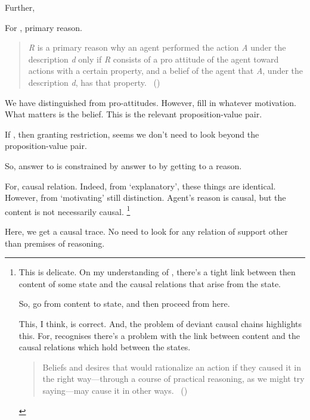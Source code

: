 \begin{note}
  \color{red}

  Further,

  For \citeauthor{Davidson:1963aa}, primary reason.

  \begin{quote}
    \emph{R} is a primary reason why an agent performed the action \emph{A} under the description \emph{d} only if \emph{R} consists of a pro attitude of the agent toward actions with a certain property, and a belief of the agent that \emph{A}, under the description \emph{d}, has that property.\newline
    \mbox{ }\hfill\mbox{(\citeyear[687]{Davidson:1963aa})}
  \end{quote}

  We have distinguished \qWhy{} from pro-attitudes.
  However, fill in whatever motivation.
  What matters is the belief.
  This is the relevant proposition-value pair.

  If \citeauthor{Davidson:1963aa}, then granting restriction, seems we don't need to look beyond the proposition-value pair.
\end{note}

\begin{note}
  So, answer to \qWhy{} is constrained by answer to \qHow{} by getting to a reason.

  For, causal relation.
  Indeed, from `explanatory', these things are identical.
  However, from `motivating' still distinction.
  Agent's reason is causal, but the content is not necessarily causal.%
  \footnote{
    This is delicate.
    On my understanding of \citeauthor{Davidson:1963aa}, there's a tight link between then content of some state and the causal relations that arise from the state.

    So, go from content to state, and then proceed from here.

    This, I think, is correct.
    And, the problem of deviant causal chains highlights this.
    For, \citeauthor{Davidson:1963aa} recognises there's a problem with the link between content and the causal relations which hold between the states.

    \begin{quote}
      Beliefs and desires that would rationalize an action if they caused it in the right way—through a course of practical reasoning, as we might try saying---may cause it in other ways.%
      \mbox{ }\hfill\mbox{(\citeyear[79]{Davidson:1973vd})}
    \end{quote}
  }

  Here, we get a causal trace.
  No need to look for any relation of support other than premises of reasoning.
\end{note}

